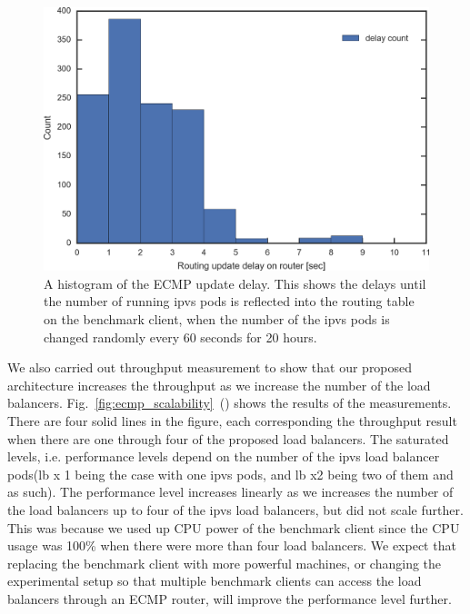 \begin{figure}[h]
  \includegraphics[width=0.9\columnwidth,left]{Figs/ecmp_delay_histgram_ieice}
  \centering
  \begin{minipage}{0.9\columnwidth}
    \caption[A histogram of the ECMP update delay]{
      A histogram of the ECMP update delay.
      This shows the delays until the number of running ipvs pods is reflected into the routing table on the benchmark client,
    when the number of the ipvs pods is changed randomly every 60 seconds for 20 hours.
    }
  \end{minipage}
  \label{fig:ecmp_delay_histgram_ieice}
\end{figure}

We also carried out throughput measurement to show that our proposed architecture increases the throughput as we increase the number of the load balancers.
Fig.~\ref{fig:ecmp_scalability}~() shows the results of the measurements.
There are four solid lines in the figure, each corresponding the throughput result when there are one through four of the proposed load balancers.
The saturated levels, i.e. performance levels depend on the number of the ipvs load balancer pods(lb x 1 being the case with one ipvs pods, and lb x2 being two of them and as such). The performance level increases linearly as we increases the number of the load balancers up to four of the ipvs load balancers, but did not scale further.
This was because we used up CPU power of the benchmark client since the CPU usage was 100\% when there were more than four load balancers.
We expect that replacing the benchmark client with more powerful machines, or changing the experimental setup so that multiple benchmark clients can access the load balancers through an ECMP router, will improve the performance level further.

